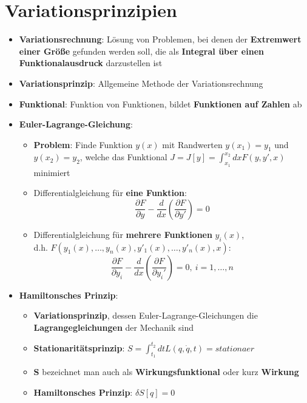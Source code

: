 \section{Variationsprinzipien}%
\label{var:sec:variationsprinzipien}

\begin{itemize}
	\item \textbf{Variationsrechnung}: Lösung von Problemen, bei denen der \textbf{Extremwert einer Größe} gefunden werden soll, die als \textbf{Integral über einen Funktionalausdruck} darzustellen ist
	\item \textbf{Variationsprinzip}: Allgemeine Methode der Variationsrechnung
	\item \textbf{Funktional}: Funktion von Funktionen, bildet \textbf{Funktionen auf Zahlen} ab
	\item \textbf{Euler-Lagrange-Gleichung}:
	\begin{itemize}
		\item \textbf{Problem}: Finde Funktion $y(x)$ mit Randwerten $y(x_1) = y_1$ und $y(x_2) = y_2$, welche das Funktional $J = J[y] = \int^{x_2}_{x_1} dx F(y, y', x)$ minimiert
		\item Differentialgleichung für \textbf{eine Funktion}:
		$$
			\frac{\partial F}{\partial y} - \frac{d}{dx}(\frac{\partial F}{\partial y'}) = 0
		$$
		\item Differentialgleichung für \textbf{mehrere Funktionen} $y_i(x)$,\\d.h. $F(y_1(x), \dots, y_n(x), y'_1(x), \dots, y'_n(x), x)$:
		$$
			\frac{\partial F}{\partial y_i} - \frac{d}{dx}(\frac{\partial F}{\partial y_i'}) = 0,\ i = 1, \dots, n
		$$
	\end{itemize}
	\item \textbf{Hamiltonsches Prinzip}:
	\begin{itemize}
		\item \textbf{Variationsprinzip}, dessen Euler-Lagrange-Gleichungen die \textbf{Lagrangegleichungen} der Mechanik sind
		\item \textbf{Stationaritätsprinzip}: $S = \int^{t_2}_{t_1} dt L(q, \dot{q}, t) = stationaer$
		\item \textbf{S} bezeichnet man auch als \textbf{Wirkungsfunktional} oder kurz \textbf{Wirkung}
		\item \textbf{Hamiltonsches Prinzip}: $\delta S[q] = 0$
	\end{itemize}
\end{itemize}